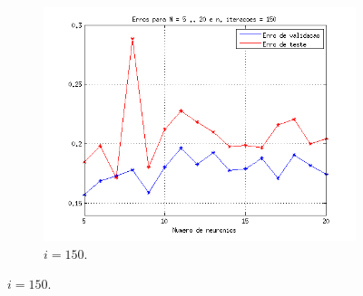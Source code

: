 \begin{figure}[H]
\begin{subfigure}{.33\textwidth}
				  \centering
				  \includegraphics[width=1\linewidth]{image/mlp_150_iterations}
				  \caption{\(i=150\).}
				\end{subfigure}%
				

\end{figure}
